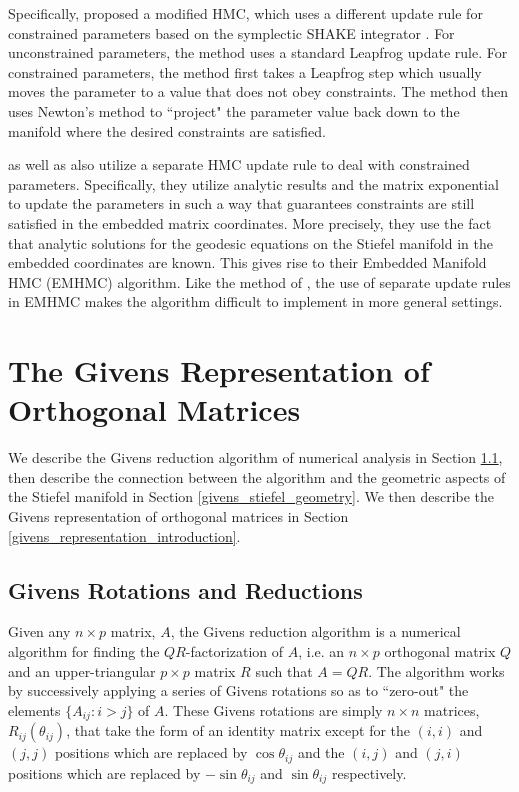 \documentclass[ba]{imsart}
\numberwithin{equation}{section}
\theoremstyle{plain}
\begin{document}
\noindent Specifically, \cite{brubaker2012family} proposed a modified HMC, which uses a different update rule for constrained parameters based on the symplectic SHAKE integrator \citep{leimkuhler2004simulating}. For unconstrained parameters, the method uses a standard Leapfrog update rule. For constrained parameters, the method first takes a Leapfrog step which usually moves the parameter to a value that does not obey constraints. The method then uses Newton's method to ``project" the parameter value back down to the manifold where the desired constraints are satisfied.

\noindent \citet{byrne2013geodesic} as well as \citet{holbrook2016bayesian} also utilize a separate HMC update rule to deal with constrained parameters. Specifically, they utilize analytic results and the matrix exponential to update the parameters in such a way that guarantees constraints are still satisfied in the embedded matrix coordinates. More precisely, they use the fact that analytic solutions for the geodesic equations on the Stiefel manifold in the embedded coordinates are known. This gives rise to their Embedded Manifold HMC (EMHMC) algorithm. Like the method of \cite{brubaker2012family}, the use of separate update rules in EMHMC makes the algorithm difficult to implement in more general settings.

\section{The Givens Representation of Orthogonal Matrices} \label{Givens}
We describe the Givens reduction algorithm of numerical analysis in Section \ref{givens_reduction}, then describe the connection between the algorithm and the geometric aspects of the Stiefel manifold in Section \ref{givens_stiefel_geometry}. We then describe the Givens representation of orthogonal matrices in Section \ref{givens_representation_introduction}.

\subsection{Givens Rotations and Reductions} \label{givens_reduction}
Given any $n \times p$ matrix, $A$, the Givens reduction algorithm is a numerical algorithm for finding the $QR$-factorization of $A$, i.e. an $n\times p$ orthogonal matrix $Q$ and an upper-triangular $p \times p$ matrix $R$ such that $A = QR$. The algorithm works by successively applying a series of Givens rotations so as to ``zero-out" the elements $\{A_{ij} : i > j \}$ of $A$. These Givens rotations are simply $n \times n$ matrices, $R_{ij}(\theta_{ij})$, that take the form of an identity matrix except for the $(i,i)$ and $(j,j)$ positions which are replaced by $\cos \theta_{ij}$ and the $(i,j)$ and $(j,i)$ positions which are replaced by $-\sin \theta_{ij}$ and $\sin \theta_{ij}$ respectively.
\end{document}

